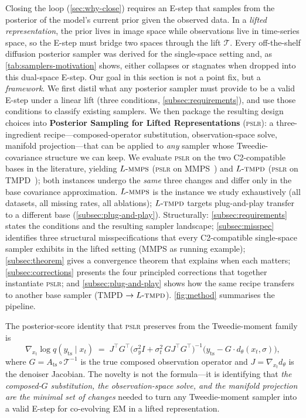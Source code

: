 \documentclass{article}
\theoremstyle{plain}
\theoremstyle{definition}
\theoremstyle{remark}
\newcommand{\tsimg}{\mathcal{T}}
\newcommand{\imgts}{\mathcal{T}^{-1}}
\newcommand{\pslr}{\textsc{pslr}}
\newcommand{\lmmps}{L\mbox{-}\textsc{mmps}}
\newcommand{\ltmpd}{L\mbox{-}\textsc{tmpd}}
\newcommand{\Ats}{A_{\mathrm{ts}}}
\newcommand{\yts}{y_{\mathrm{ts}}}
\begin{document}
Closing the loop (\cref{sec:why-close}) requires an E-step that samples from the posterior of the model's current prior given the observed data. In a \emph{lifted representation}, the prior lives in image space while observations live in time-series space, so the E-step must bridge two spaces through the lift $\tsimg$. Every off-the-shelf diffusion posterior sampler was derived for the single-space setting and, as \cref{tab:samplers-motivation} shows, either collapses or stagnates when dropped into this dual-space E-step. Our goal in this section is not a point fix, but a \emph{framework}.
%
We first distil what any posterior sampler must provide to be a valid E-step under a linear lift (three conditions, \cref{subsec:requirements}), and use those conditions to classify existing samplers. We then package the resulting design choices into \textbf{Posterior Sampling for Lifted Representations} (\pslr{}): a three-ingredient recipe---composed-operator substitution, observation-space solve, manifold projection---that can be applied to \emph{any} sampler whose Tweedie-covariance structure we can keep. We evaluate \pslr{} on the two C2-compatible bases in the literature, yielding \textbf{$\lmmps$} (\pslr{} on MMPS~\citep{rozet2024diem}) and $\ltmpd$ (\pslr{} on TMPD~\citep{boys2023tmpd}); both instances undergo the \emph{same} three changes and differ only in the base covariance approximation. $\lmmps$ is the instance we study exhaustively (all datasets, all missing rates, all ablations); $\ltmpd$ targets plug-and-play transfer to a different base (\cref{subsec:plug-and-play}).
%
Structurally: \cref{subsec:requirements} states the conditions and the resulting sampler landscape; \cref{subsec:misspec} identifies three structural misspecifications that every C2-compatible single-space sampler exhibits in the lifted setting (MMPS as running example); \cref{subsec:theorem} gives a convergence theorem that explains when each matters; \cref{subsec:corrections} presents the four principled corrections that together instantiate \pslr{}; and \cref{subsec:plug-and-play} shows how the same recipe transfers to another base sampler (TMPD $\to \ltmpd$). \cref{fig:method} summarises the pipeline.

The posterior-score identity that \pslr{} preserves from the Tweedie-moment family is
\begin{equation}
\label{eq:pslr-score}
\nabla_{x_t} \log q(\yts \mid x_t) \;=\; J^\top G^\top \bigl(\sigma_y^2 I + \sigma_t^2 \, G J^\top G^\top\bigr)^{-1} \bigl(\yts - G \cdot d_\theta(x_t, \sigma)\bigr),
\end{equation}
where $G = \Ats \circ \imgts$ is the true composed observation operator and $J = \nabla_{x_t} d_\theta$ is the denoiser Jacobian. The novelty is not the formula---it is identifying that \emph{the composed-$G$ substitution, the observation-space solve, and the manifold projection are the minimal set of changes} needed to turn any Tweedie-moment sampler into a valid E-step for co-evolving EM in a lifted representation.
\end{document}
